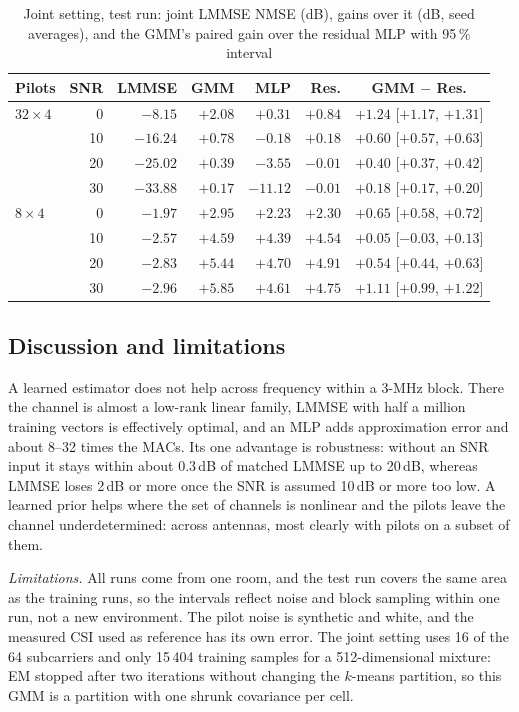 \documentclass[conference]{IEEEtran}
\begin{document}
\begin{table}[t]
\caption{Joint setting, test run: joint LMMSE NMSE (dB), gains over it (dB, seed averages), and the
GMM's paired gain over the residual MLP with 95\,\% interval}
\label{tab:joint}
\centering\footnotesize
\setlength{\tabcolsep}{3pt}
\begin{tabular}{@{}lrrrrrc@{}}
\toprule
Pilots & SNR & LMMSE & GMM & MLP & Res. & GMM $-$ Res.\\
\midrule
$32\times4$ & 0  & $-8.15$ & $+2.08$ & $+0.31$ & $+0.84$ & $+1.24$ [$+1.17$, $+1.31$]\\
            & 10 & $-16.24$ & $+0.78$ & $-0.18$ & $+0.18$ & $+0.60$ [$+0.57$, $+0.63$]\\
            & 20 & $-25.02$ & $+0.39$ & $-3.55$ & $-0.01$ & $+0.40$ [$+0.37$, $+0.42$]\\
            & 30 & $-33.88$ & $+0.17$ & $-11.12$ & $-0.01$ & $+0.18$ [$+0.17$, $+0.20$]\\
\midrule
$8\times4$  & 0  & $-1.97$ & $+2.95$ & $+2.23$ & $+2.30$ & $+0.65$ [$+0.58$, $+0.72$]\\
            & 10 & $-2.57$ & $+4.59$ & $+4.39$ & $+4.54$ & $+0.05$ [$-0.03$, $+0.13$]\\
            & 20 & $-2.83$ & $+5.44$ & $+4.70$ & $+4.91$ & $+0.54$ [$+0.44$, $+0.63$]\\
            & 30 & $-2.96$ & $+5.85$ & $+4.61$ & $+4.75$ & $+1.11$ [$+0.99$, $+1.22$]\\
\bottomrule
\end{tabular}
\end{table}

\subsection{Discussion and limitations}
A learned estimator does not help across frequency within a 3-MHz block. There the channel is almost a
low-rank linear family, LMMSE with half a million training vectors is effectively optimal, and an MLP adds
approximation error and about 8--32 times the MACs. Its one advantage is robustness: without an SNR input
it stays within about 0.3\,dB of matched LMMSE up to 20\,dB, whereas LMMSE loses 2\,dB or more once the
SNR is assumed 10\,dB or more too low. A learned prior helps
where the set of channels is nonlinear and the pilots leave the channel underdetermined: across antennas,
most clearly with pilots on a subset of them.

\emph{Limitations.} All runs come from one room, and the test run covers the same area as the training
runs, so the intervals reflect noise and block sampling within one run, not a new environment. The pilot
noise is synthetic and white, and the measured CSI used as reference has its own error. The joint setting uses 16 of the 64 subcarriers and only 15\,404 training samples for
a 512-dimensional mixture: EM stopped after two iterations without changing the $k$-means partition, so
this GMM is a partition with one shrunk covariance per cell.
\end{document}

